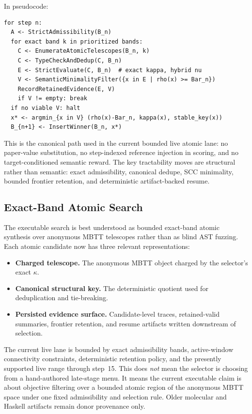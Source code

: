 \documentclass[11pt,a4paper]{article}
\theoremstyle{plain}
\theoremstyle{definition}
\theoremstyle{remark}
\begin{document}
In pseudocode:
\begin{verbatim}
for step n:
  A <- StrictAdmissibility(B_n)
  for exact band k in prioritized bands:
    C <- EnumerateAtomicTelescopes(B_n, k)
    C <- TypeCheckAndDedup(C, B_n)
    E <- StrictEvaluate(C, B_n)  # exact kappa, hybrid nu
    V <- SemanticMinimalityFilter({x in E | rho(x) >= Bar_n})
    RecordRetainedEvidence(E, V)
    if V != empty: break
  if no viable V: halt
  x* <- argmin_{x in V} (rho(x)-Bar_n, kappa(x), stable_key(x))
  B_{n+1} <- InsertWinner(B_n, x*)
\end{verbatim}

This is the canonical path used in the current bounded live atomic lane: no paper-value substitution, no step-indexed reference injection in scoring, and no target-conditioned semantic reward.
The key tractability moves are structural rather than semantic: exact admissibility, canonical dedupe, SCC minimality, bounded frontier retention, and deterministic artifact-backed resume.

\subsection{Exact-Band Atomic Search}
\label{sec:mdp-mcts}

The executable search is best understood as bounded exact-band atomic synthesis over anonymous MBTT telescopes rather than as blind AST fuzzing.
Each atomic candidate now has three relevant representations:
\begin{itemize}[nosep]
    \item \textbf{Charged telescope.} The anonymous MBTT object charged by the selector's exact $\kappa$.
    \item \textbf{Canonical structural key.} The deterministic quotient used for deduplication and tie-breaking.
    \item \textbf{Persisted evidence surface.} Candidate-level traces, retained-valid summaries, frontier retention, and resume artifacts written downstream of selection.
\end{itemize}

The current live lane is bounded by exact admissibility bands, active-window connectivity constraints, deterministic retention policy, and the presently supported live range through step~15.
This does \emph{not} mean the selector is choosing from a hand-authored late-stage menu.
It means the current executable claim is about objective filtering over a bounded atomic region of the anonymous MBTT space under one fixed admissibility and selection rule.
Older molecular and Haskell artifacts remain donor provenance only.
\end{document}
